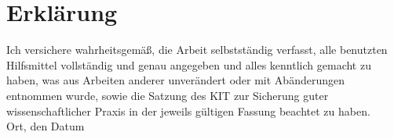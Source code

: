 \documentclass[12pt,a4paper]{scrartcl}
\numberwithin{equation}{section}
\begin{document}
  \newpage

\begin{thebibliography}{Lam00}
 
\end{thebibliography}
 
      

\newpage
  
 \thispagestyle{empty}


\vspace*{8cm}


\section*{Erkl\"arung}

Ich  versichere  wahrheitsgem\"a\ss,  die  Arbeit selbstst\"andig verfasst,  alle  benutzten  Hilfsmittel  vollst\"andig  und  genau  angegeben  und  alles kenntlich  gemacht  zu  haben,  was  aus  Arbeiten  anderer  unver\"andert  oder  mit  Ab\"anderungen entnommen  wurde,  sowie die Satzung  des  KIT  zur  Sicherung guter wissenschaftlicher Praxis in der jeweils g\"ultigen Fassung beachtet zu haben.
\\[2ex] 

\noindent
Ort, den Datum\\[5ex]

\end{document}
